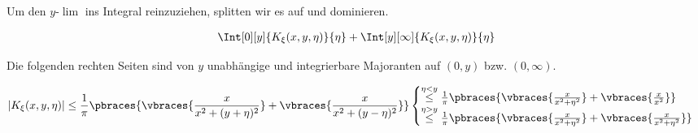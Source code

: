 \begin{solution}
  Um den $y$-$\lim$ ins Integral reinzuziehen, splitten wir es auf und dominieren.

  \begin{align*}
    \Int[0][y]{K_\xi(x, y, \eta)}{\eta}
    +
    \Int[y][\infty]{K_\xi(x, y, \eta)}{\eta}
  \end{align*}

  Die folgenden rechten Seiten sind von $y$ unabhängige und integrierbare Majoranten auf $(0, y)$ bzw. $(0, \infty)$.

  \begin{align*}
    |K_\xi(x, y, \eta)|
    \leq
    \frac{1}{\pi}
    \pbraces
    {
      \vbraces
      {
        \frac{x}{x^2 + (y + \eta)^2}
      }
      +
      \vbraces
      {
        \frac{x}{x^2 + (y - \eta)^2}
      }
    }
    \begin{cases}
      \stackrel{\eta < y}{\leq}
      \frac{1}{\pi}
      \pbraces
      {
        \vbraces
        {
          \frac{x}{x^2 + \eta^2}
        }
        +
        \vbraces
        {
          \frac{x}{x^2}
        }
      } \\
      \stackrel{\eta > y}{\leq}
      \frac{1}{\pi}
      \pbraces
      {
        \vbraces
        {
          \frac{x}{x^2 + \eta^2}
        }
        +
        \vbraces
        {
          \frac{x}{x^2 + \eta^2}
        }
      }
    \end{cases}
  \end{align*}

\end{solution}

